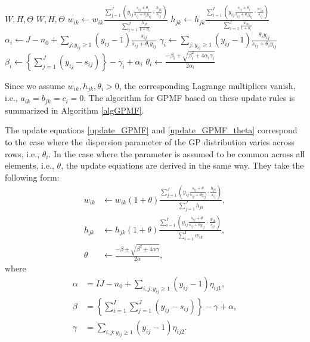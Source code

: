 \documentclass[pdflatex,sn-basic]{sn-jnl}%
\theoremstyle{thmstyleone}%
\theoremstyle{thmstyletwo}%
\theoremstyle{thmstylethree}%
\begin{document}
\begin{algorithm}[b]
	\caption{Maximum Likelihood Estimation of $W$ and $H$ in GPMF}         
	\label{algGPMF}
	\begin{algorithmic}
		\Require $W,H,\Theta$
		\Ensure $W,H,\Theta$
		\State $w_{ik} \leftarrow w_{ik}\frac{\sum_{j=1}^{J}\left(y_{ij}\frac{s_{ij}+\theta_{i}}{s_{ij} + \theta_{i}y_{ij}}\cdot\frac{h_{jk}}{s_{ij}}\right)}{\sum_{j=1}^{J}\frac{h_{jk}}{1+\theta_{i}}}$
		\State $h_{jk} \leftarrow h_{jk}\frac{\sum_{i=1}^{I}\left(y_{ij}\frac{s_{ij}+\theta_{i}}{s_{ij} + \theta_{i} y_{ij}}\cdot\frac{w_{ik}}{s_{ij}}\right)}{\sum_{i=1}^{I}\frac{w_{ik}}{1+\theta_{i}}}$
		\EndFor
		\State $\alpha_{i}\leftarrow J-n_{0}+\sum_{j:y_{ij}\ge1}(y_{ij}-1)\frac{s_{ij}}{s_{ij} + \theta_{i} y_{ij}}$
		\State $\gamma_{i}\leftarrow \sum_{j:y_{ij}\ge1}(y_{ij}-1)\frac{\theta_{i} y_{ij}}{s_{ij} + \theta_{i} y_{ij}}$
		\State $\beta_{i}\leftarrow \left\{\sum_{j=1}^{J}(y_{ij}-s_{ij})\right\}-\gamma_{i}+\alpha_{i}$
		\State $\theta_{i}\leftarrow \frac{-\beta_{i}+\sqrt{\beta_{i}^{2}+4\alpha_{i}\gamma_{i}}}{2\alpha_{i}}$
		\EndWhile
	\end{algorithmic}
\end{algorithm}

Since we assume $w_{ik},h_{jk},\theta_{i}>0$, the corresponding Lagrange multipliers vanish, i.e., $a_{ik}=b_{jk}=c_{i}=0$.  
The algorithm for GPMF based on these update rules is summarized in Algorithm \ref{algGPMF}.


The update equations \eqref{update_GPMF} and \eqref{update_GPMF_theta} correspond to the case where the dispersion parameter of the GP distribution varies across rows, i.e., $\theta_{i}$.  
In the case where the parameter is assumed to be common across all elements, i.e., $\theta$, the update equations are derived in the same way. They take the following form:
\begin{align}
	w_{ik} &\leftarrow w_{ik}(1+\theta)\frac{\sum_{j=1}^{J}\left(y_{ij}\frac{s_{ij}+\theta}{s_{ij} + \theta y_{ij}}\cdot\frac{h_{jk}}{s_{ij}}\right)}{\sum_{j=1}^{J}h_{jk}},\\
	h_{jk} &\leftarrow h_{jk}(1+\theta)\frac{\sum_{i=1}^{I}\left(y_{ij}\frac{s_{ij}+\theta}{s_{ij} + \theta y_{ij}}\cdot\frac{w_{ik}}{s_{ij}}\right)}{\sum_{i=1}^{I}w_{ik}}, 
	\label{update_GPMF1} \\
	\theta &\leftarrow \frac{-\beta+\sqrt{\beta^{2}+4\alpha\gamma}}{2\alpha},
	\label{update_GPMF1_theta}
\end{align}
where
\begin{align*}
	\alpha &= IJ-n_{0}+\sum_{i,j:y_{ij}\ge1}(y_{ij}-1)\eta_{ij1},\\
	\beta  &= \left\{\sum_{i=1}^{I}\sum_{j=1}^{J}(y_{ij}-s_{ij})\right\}-\gamma+\alpha,\\
	\gamma &= \sum_{i,j:y_{ij}\ge1}(y_{ij}-1)\eta_{ij2}.
\end{align*}
\end{document}
